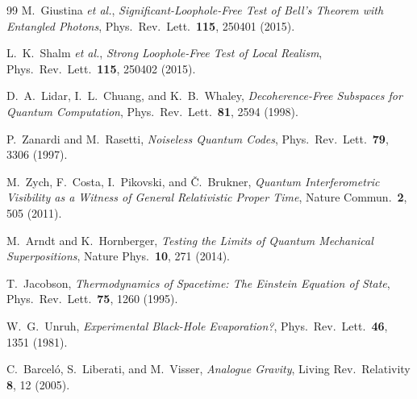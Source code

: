 \documentclass[11pt,a4paper]{article}
\theoremstyle{definition}
\theoremstyle{remark}
\begin{document}
\begin{thebibliography}{99}
M.~Giustina \textit{et al.},
\textit{Significant-Loophole-Free Test of Bell's Theorem with Entangled Photons},
Phys.\ Rev.\ Lett.\ \textbf{115}, 250401 (2015).

L.~K.~Shalm \textit{et al.},
\textit{Strong Loophole-Free Test of Local Realism},
Phys.\ Rev.\ Lett.\ \textbf{115}, 250402 (2015).

D.~A.~Lidar, I.~L.~Chuang, and K.~B.~Whaley,
\textit{Decoherence-Free Subspaces for Quantum Computation},
Phys.\ Rev.\ Lett.\ \textbf{81}, 2594 (1998).

P.~Zanardi and M.~Rasetti,
\textit{Noiseless Quantum Codes},
Phys.\ Rev.\ Lett.\ \textbf{79}, 3306 (1997).

M.~Zych, F.~Costa, I.~Pikovski, and \v{C}.~Brukner,
\textit{Quantum Interferometric Visibility as a Witness of General Relativistic Proper Time},
Nature Commun.\ \textbf{2}, 505 (2011).

M.~Arndt and K.~Hornberger,
\textit{Testing the Limits of Quantum Mechanical Superpositions},
Nature Phys.\ \textbf{10}, 271 (2014).


T.~Jacobson,
\textit{Thermodynamics of Spacetime: The Einstein Equation of State},
Phys.\ Rev.\ Lett.\ \textbf{75}, 1260 (1995).

W.~G.~Unruh,
\textit{Experimental Black-Hole Evaporation?},
Phys.\ Rev.\ Lett.\ \textbf{46}, 1351 (1981).

C.~Barcel\'o, S.~Liberati, and M.~Visser,
\textit{Analogue Gravity},
Living Rev.\ Relativity \textbf{8}, 12 (2005).

\end{thebibliography}
\end{document}
